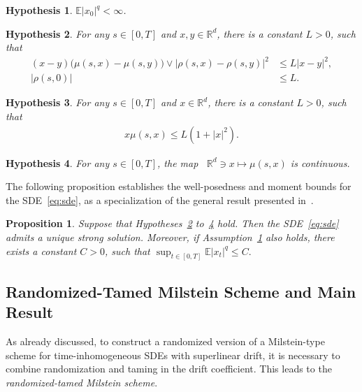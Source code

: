 \documentclass[reqno,  oneside, 12pt]{amsart}
\newtheorem{proposition}{Proposition}[section]
\newtheorem{asump}{Hypothesis}[section]
\newcommand{\E}{\mathbb E}
\begin{document}
\begin{asump}\label{asum:ic}
	$\E|x_0|^{q}<\infty$.
\end{asump}
\begin{asump} \label{asum:monotonocity}
	For any $s\in[0,T]$ and $x, y\in \mathbb R^d$, there is a   constant $L>0$,  such that
	\begin{align*}
		(x-y)\big(\mu(s,x)-\mu(s,y)\big)\vee |\rho(s,x)-\rho(s,y)|^2 
		&\leq   L|x-y|^2,
		\\
		|\rho(s,0)|&\leq L.
	\end{align*}
\end{asump}

\begin{asump}
	\label{asum:coercivity}
	For any \( s \in [0,T] \) and \( x \in \mathbb{R}^d \), there is a constant \( L>0 \), such that
	\begin{align*}
		x\mu(s,x) \leq  L(1+|x|^{2}).
	\end{align*}
	
\end{asump}

\begin{asump} \label{asum:continuity}
	For any $s\in  [0,T]$, the map \, $\mathbb R^d\ni x\mapsto \mu(s,x)$ is  continuous.
\end{asump}




The following proposition establishes the well-posedness and moment bounds for the SDE~\eqref{eq:sde}, as a specialization of the general result presented in~\cite{Mao2007}.

\begin{proposition} \label{prop:mb:sde}
	Suppose that Hypotheses~\mbox{\normalfont\ref{asum:monotonocity}} to~\mbox{\normalfont\ref{asum:continuity}} hold. Then the SDE~\eqref{eq:sde} admits a unique strong solution. Moreover, if Assumption~\mbox{\normalfont\ref{asum:ic}} also holds, there exists a constant $C > 0$, such that
	\(
	\sup_{t \in [0,T]} \E|x_t|^q \leq C.
	\)
\end{proposition}


\subsection{Randomized-Tamed Milstein Scheme and Main Result}  \label{sec:randomized_scm}
As already discussed, to construct a randomized version of a Milstein-type scheme 
for time-inhomogeneous SDEs with superlinear drift, it is necessary to combine randomization and taming in the drift coefficient. This leads to the \textit{randomized-tamed Milstein scheme}.
\end{document}

